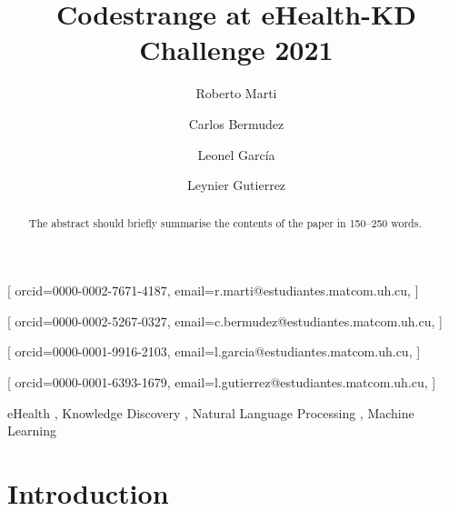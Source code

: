 \documentclass[
]{ceurart}
\begin{document}


\title{Codestrange at eHealth-KD Challenge 2021}


\author[1]{Roberto Marti}[%
orcid=0000-0002-7671-4187,
email=r.marti@estudiantes.matcom.uh.cu,
]
\author[1]{Carlos Bermudez}[%
orcid=0000-0002-5267-0327,
email=c.bermudez@estudiantes.matcom.uh.cu,
]
\author[1]{Leonel García}[%
orcid=0000-0001-9916-2103,
email=l.garcia@estudiantes.matcom.uh.cu,
]
\author[1]{Leynier Gutierrez}[%
orcid=0000-0001-6393-1679,
email=l.gutierrez@estudiantes.matcom.uh.cu,
]

\address[1]{University of Havana, Havana, Cuba}

\begin{abstract}
The abstract should briefly summarise the contents of the paper in 150--250 words.
\end{abstract}

\begin{keywords}
  eHealth \sep
  Knowledge Discovery \sep
  Natural Language Processing \sep
  Machine Learning
\end{keywords}

\maketitle

\pagestyle{plain}

\section{Introduction}
\end{document}
